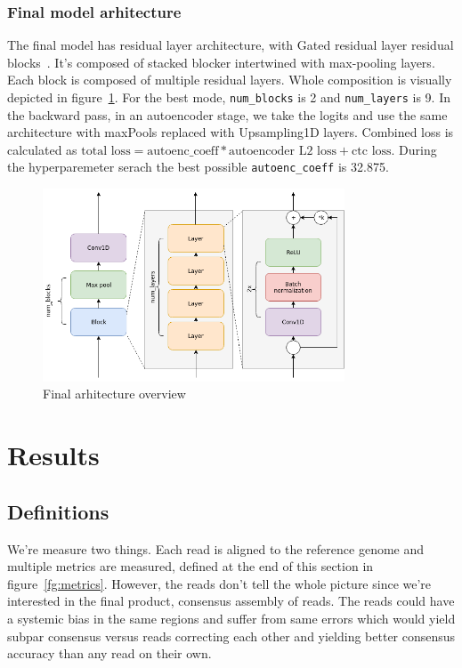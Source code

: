 \documentclass[times, utf8, diplomski, english]{fer}
\begin{document}
\subsection{Final model arhitecture}
\label{subsec:final-model-architecture}

The final model has residual layer architecture, with Gated residual layer residual blocks~\citep{resnet,DBLP:journals/corr/Savarese16}. 
It's composed of stacked blocker intertwined with max-pooling layers.
Each block is composed of multiple residual layers. 
Whole composition is visually depicted in figure~\ref{fg:final_arch}.
For the best mode, \texttt{num\_blocks} is 2 and \texttt{num\_layers} is 9.
In the backward pass, in an autoencoder stage, we take the logits and use the same architecture with maxPools replaced with Upsampling1D layers.
Combined loss is calculated as $\text{total loss} = \text{autoenc\_coeff} * \text{autoencoder L2 loss} + \text{ctc loss}$.
During the hyperparemeter serach the best possible \texttt{autoenc\_coeff} is 32.875. 

\begin{figure}
    \begin{center}
        \includegraphics[width=0.8\textwidth]{final_arch}
        \caption{Final arhitecture overview}
        \label{fg:final_arch}
    \end{center}
\end{figure}

\chapter{Results}
\label{chap:results}

\section{Definitions}
We're measure two things. Each read is aligned to the reference genome and multiple metrics are measured, defined at the end of this section in figure~\ref{fg:metrics}. However, the reads don't tell the whole picture since we're interested in the final product, consensus assembly of reads. The reads could have a systemic bias in the same regions and suffer from same errors which would yield subpar consensus versus reads correcting each other and yielding better consensus accuracy than any read on their own.
\end{document}
